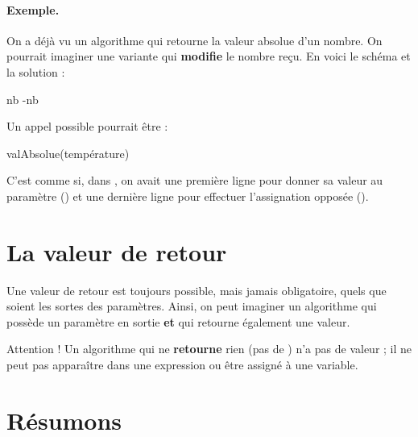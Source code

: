 		\paragraph{Exemple.}
		On a déjà vu un algorithme qui retourne la valeur absolue d'un nombre.
		On pourrait imaginer une variante qui \textbf{modifie}
		le nombre reçu.
		En voici le schéma et la solution :

		\begin{minipage}{6cm}		
			\begin{center}
			\end{center}
		\end{minipage}
		\quad
		\begin{minipage}{6cm}		
			\begin{LDA}
						\Let nb \Gets -nb
					\EndIf
				\EndAlgo
			\end{LDA}
		\end{minipage}
		
		Un appel possible pourrait être :

		\begin{LDA}
			\Stmt valAbsolue(température)
		\end{LDA}
	
		C'est comme si, dans ,
		on avait une première ligne pour donner sa valeur au paramètre
		()
		et une dernière ligne pour effectuer l'assignation opposée
		().
		
\section{La valeur de retour}
	
	Une valeur de retour est toujours possible,
	mais jamais obligatoire,
	quels que soient les sortes des paramètres.
	Ainsi, on peut imaginer un algorithme
	qui possède un paramètre en sortie \textbf{et}
	qui retourne également une valeur.

	Attention !
	Un algorithme qui ne \textbf{retourne} rien (pas de \Gives)
	n'a pas de valeur ;
	il ne peut pas apparaître dans une expression
	ou être assigné à une variable.

\section{Résumons}

